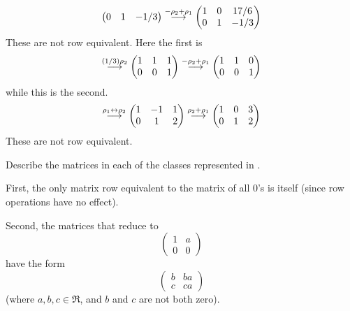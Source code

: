 \begin{exercises}
\begin{answer}
\begin{exparts}
\begin{equation*}
\begin{pmatrix}
              0  &1  &-1/3
            \end{pmatrix}
            \mathrel{ \mathop{\longrightarrow}\limits^{-\rho_2+\rho_1\mathstrut}_{ \begin{subarray}{l} \relax \end{subarray}}}
            \begin{pmatrix}
              1  &0  &17/6 \\
              0  &1  &-1/3
            \end{pmatrix}
          \end{equation*}
          These are not row equivalent.
        \partsitem Here the first is
          \begin{equation*}
            \mathrel{ \mathop{\longrightarrow}\limits^{(1/3)\rho_2\mathstrut}_{ \begin{subarray}{l} \relax \end{subarray}}}
            \begin{pmatrix}
              1  &1  &1  \\
              0  &0  &1
            \end{pmatrix}
            \mathrel{ \mathop{\longrightarrow}\limits^{-\rho_2+\rho_1\mathstrut}_{ \begin{subarray}{l} \relax \end{subarray}}}
            \begin{pmatrix}
              1  &1  &0  \\
              0  &0  &1
            \end{pmatrix}
          \end{equation*}
          while this is the second.
          \begin{equation*}
            \mathrel{ \mathop{\longrightarrow}\limits^{\rho_1\leftrightarrow\rho_2\mathstrut}_{ \begin{subarray}{l} \relax \end{subarray}}}
            \begin{pmatrix}
              1  &-1 &1  \\
              0  &1  &2
            \end{pmatrix}
            \mathrel{ \mathop{\longrightarrow}\limits^{\rho_2+\rho_1\mathstrut}_{ \begin{subarray}{l} \relax \end{subarray}}}
            \begin{pmatrix}
              1  &0  &3  \\
              0  &1  &2
            \end{pmatrix}
          \end{equation*}
          These are not row equivalent.
       \end{exparts}  
     \end{answer}
  \item 
     Describe the matrices in each of the classes represented in
     .
     \begin{answer}
       First, the only matrix row equivalent to the matrix of all
       \( 0 \)'s is itself (since row operations have no effect).

       Second, the matrices that reduce to 
       \begin{equation*}
         \begin{pmatrix}
           1  &a  \\
           0  &0
         \end{pmatrix}
       \end{equation*}
       have the form
       \begin{equation*}
         \begin{pmatrix}
           b  &ba \\
           c  &ca
         \end{pmatrix}
       \end{equation*}
       (where \( a,b,c\in\Re \), and \(b\) and \(c\) are not both zero).  


\end{answer}
\end{exercises}
